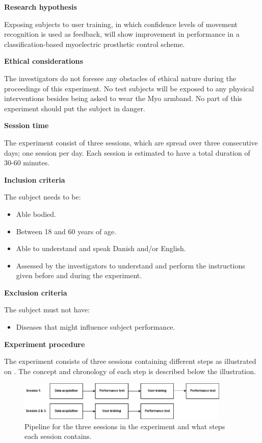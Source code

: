 \textbf{Research hypothesis}

Exposing subjects to user training, in which confidence levels of movement recognition is used as feedback, will show improvement in performance in a classification-based myoelectric prosthetic control scheme.%

\textbf{Ethical considerations}  

The investigators do not foresee any obstacles of ethical nature during the proceedings of this experiment. No test subjects will be exposed to any physical interventions besides being asked to wear the Myo armband. No part of this experiment should put the subject in danger. 

\textbf{Session time} 

The experiment consist of three sessions, which are spread over three consecutive days; one session per day. Each session is estimated to have a total duration of 30-60 minutes. 

\textbf{Inclusion criteria}

The subject needs to be:
\begin{itemize}
	\item Able bodied.
	\item Between 18 and 60 years of age.
	\item Able to understand and speak Danish and/or English.
	\item Assessed by the investigators to understand and perform the instructions given  before and during the experiment. 
\end{itemize}


\textbf{Exclusion criteria}

The subject must not have:
\begin{itemize}
	\item Diseases that might influence subject performance. 
\end{itemize}


\textbf{\Large{Experiment procedure}}

The experiment consists of three sessions containing different steps as illustrated on . The concept and chronology of each step is described below the illustration.


\begin{figure}[H]                                         
	\includegraphics[width=0.9\textwidth]{figures/pMethods/experiment_protocol_pipeline}  
	\caption{Pipeline for the three sessions in the experiment and what steps each session contains.}
	\label{fig:experiment_protocol_pipeline} 
\end{figure}  


